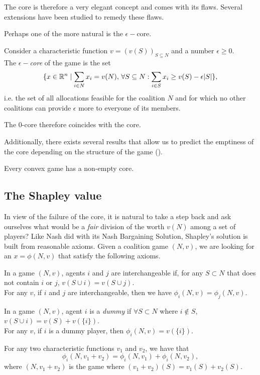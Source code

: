 The core is therefore a very elegant concept and comes with its flaws. Several extensions have been studied to remedy these flaws.

Perhaps one of the more natural is the $\epsilon-$core.
\begin{definition}
Consider a characteristic function $v = (v(S))_{S \subseteq N}$ and a number $\epsilon \geq 0$.\\
The $\epsilon-$\emph{core} of the game is the set
$$ \{x \in \mathbb{R}^n \mid \sum_{i \in N} x_i = v(N), \, \forall S \subseteq N:  \sum_{i \in S} x_i \geq v(S) - \epsilon|S|\}, $$
i.e. the set of all allocations feasible for the coalition $N$ and for which no other coalitions can provide $\epsilon$ more to everyone of its members.
\end{definition}
The $0$-core therefore coincides with the core.

Additionally, there exists several results that allow us to predict the emptiness of the core depending on the structure of the game (\cite[Section 12.2]{ShLeMSAG}).
\begin{theorem}
Every convex game has a non-empty core.
\end{theorem}


\subsection{The Shapley value}

In view of the failure of the core, it is natural to take a step back and ask ourselves what would be a \emph{fair} division of the worth $v(N)$ among a set of players?
Like Nash did with its Nash Bargaining Solution, Shapley's solution is built from reasonable axioms.
Given a coalition game $(N,v)$, we are looking for an $x = \phi(N,v)$ that satisfy the following axioms.
\begin{axiom}[Symmetry]
In a game $(N,v)$, agents $i$ and $j$ are interchangeable if, for any $S \subset N$ that does not contain $i$ or $j$, $v(S \cup i ) = v(S \cup j).$\\
For any $v$, if $i$ and $j$ are interchangeable, then we have $\phi_i(N,v) = \phi_j(N,v).$
\end{axiom}
\begin{axiom}[Support]
In a game $(N,v)$, agent $i$ is a \emph{dummy} if $\forall S \subset N$ where $i \not \in S$, $v(S \cup i) = v(S) + v(\{i\})$.\\
For any $v$, if $i$ is a dummy player, then $\phi_i(N,v) = v(\{i\}).$
\end{axiom}
\begin{axiom}[Linearity]
For any two characteristic functions $v_1$ and $v_2$, we have that
$$ \phi_{i}(N, v_1 + v_2) = \phi_{i}(N,v_1) + \phi_i(N, v_2), $$
where $(N, v_1+v_2)$ is the game where $(v_1 + v_2)(S) = v_1(S) + v_2(S).$
\end{axiom}

